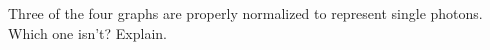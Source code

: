 Three of the four graphs are properly normalized to represent
single photons. Which one isn't? Explain.

